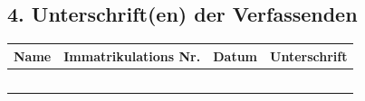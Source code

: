 \vspace{2em}

\subsection*{4. Unterschrift(en) der Verfassenden}

\begingroup
\small

\begin{tabularx}{\textwidth}{|X|X|X|X|}
\hline
\textbf{Name} &
\textbf{Immatrikulations Nr.} &
\textbf{Datum} &
\textbf{Unterschrift} \\
\hline
 & & & \\
\hline
 & & & \\
\hline
 & & & \\
\hline
 & & & \\
\hline
 & & & \\
\hline
\end{tabularx}

\endgroup

\vspace{2em}
